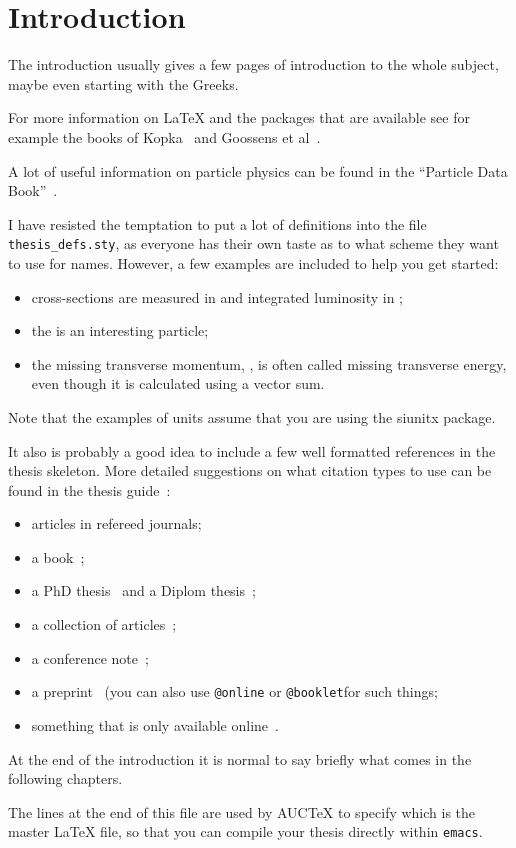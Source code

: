 \chapter{Introduction}
\label{sec:intro}

The introduction usually gives a few pages of introduction to the
whole subject, maybe even starting with the Greeks.

For more information on \LaTeX{} and the packages that are available
see for example the books of Kopka~ and Goossens et
al~.

A lot of useful information on particle physics can be found in the
\enquote{Particle Data Book}~.

I have resisted the temptation to put a lot of definitions into the
file \texttt{thesis\_defs.sty}, as everyone has their own taste as
to what scheme they want to use for names. However, a few examples
are included to help you get started:
\begin{itemize}
\setlength{\itemsep}{0pt}\setlength{\parskip}{0pt}
\item cross-sections are measured in \si{\pb} and integrated
  luminosity in \si{\invpb};
\item the \KoS is an interesting particle;
\item the missing transverse momentum, \pTmiss, is often called
  missing transverse energy, even though it is calculated using a vector sum.
\end{itemize}
Note that the examples of units assume that you are using the
\textsf{siunitx} package.

It also is probably a good idea to include a few well formatted
references in the thesis skeleton. More detailed suggestions on what
citation types to use can be found in the thesis
guide~:
\begin{itemize}
\item articles in refereed journals;
\item a book~;
\item a PhD thesis~ and a Diplom thesis~;
\item a collection of articles~;
\item a conference note~;
\item a preprint~ (you can also use
  \texttt{@online} or \texttt{@booklet}for such things;
\item something that is only available online~.
\end{itemize}

At the end of the introduction it is normal to say briefly what comes
in the following chapters.

The lines at the end of this file are used by AUCTeX to specify which
is the master \LaTeX{} file, so that you can compile your thesis
directly within \texttt{emacs}.

